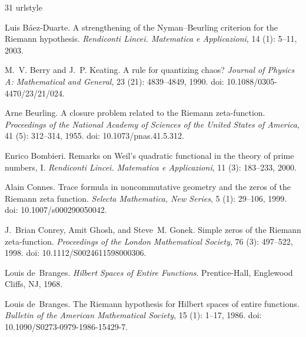 \documentclass[11pt]{article}
\theoremstyle{definition}
\begin{document}
\clearpage

\begin{thebibliography}{31}
\providecommand{\natexlab}[1]{#1}
\providecommand{\url}[1]{\texttt{#1}}
\expandafter\ifx\csname urlstyle\endcsname\relax
  \providecommand{\doi}[1]{doi: #1}\else
  \providecommand{\doi}{doi: \begingroup \urlstyle{rm}\Url}\fi

Luis B{\'a}ez-Duarte.
\newblock A strengthening of the {Nyman}--{Beurling} criterion for the {Riemann} hypothesis.
\newblock \emph{Rendiconti Lincei. Matematica e Applicazioni}, 14 (1): 5--11, 2003.

M.~V. Berry and J.~P. Keating.
\newblock A rule for quantizing chaos?
\newblock \emph{Journal of Physics A: Mathematical and General}, 23 (21): 4839--4849, 1990.
\newblock \doi{10.1088/0305-4470/23/21/024}.

Arne Beurling.
\newblock A closure problem related to the {Riemann} zeta-function.
\newblock \emph{Proceedings of the National Academy of Sciences of the United States of America}, 41 (5): 312--314, 1955.
\newblock \doi{10.1073/pnas.41.5.312}.

Enrico Bombieri.
\newblock Remarks on {Weil}'s quadratic functional in the theory of prime numbers, {I}.
\newblock \emph{Rendiconti Lincei. Matematica e Applicazioni}, 11 (3): 183--233, 2000.

Alain Connes.
\newblock Trace formula in noncommutative geometry and the zeros of the {Riemann} zeta function.
\newblock \emph{Selecta Mathematica, New Series}, 5 (1): 29--106, 1999.
\newblock \doi{10.1007/s000290050042}.

J.~Brian Conrey, Amit Ghosh, and Steve~M. Gonek.
\newblock Simple zeros of the {Riemann} zeta-function.
\newblock \emph{Proceedings of the London Mathematical Society}, 76 (3): 497--522, 1998.
\newblock \doi{10.1112/S0024611598000306}.

Louis de~Branges.
\newblock \emph{{Hilbert} Spaces of Entire Functions}.
\newblock Prentice-Hall, Englewood Cliffs, NJ, 1968.

Louis de~Branges.
\newblock The {Riemann} hypothesis for {Hilbert} spaces of entire functions.
\newblock \emph{Bulletin of the American Mathematical Society}, 15 (1): 1--17, 1986.
\newblock \doi{10.1090/S0273-0979-1986-15429-7}.


\end{thebibliography}
\end{document}
